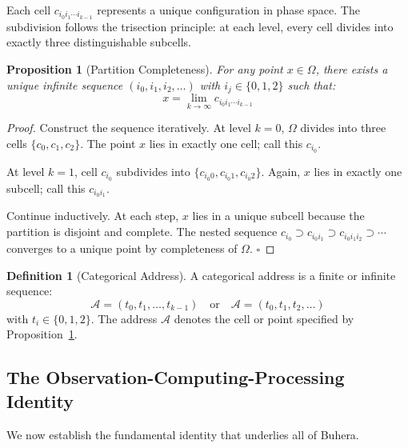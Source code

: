 \documentclass[twocolumn,10pt]{article}
\newtheorem{proposition}[theorem]{Proposition}
\theoremstyle{definition}
\newtheorem{definition}[theorem]{Definition}
\theoremstyle{remark}
\newcommand{\cataddr}{\mathcal{A}}
\begin{document}
Each cell $c_{i_0 i_1 \cdots i_{k-1}}$ represents a unique configuration in phase space. The subdivision follows the trisection principle: at each level, every cell divides into exactly three distinguishable subcells.

\begin{proposition}[Partition Completeness]
\label{prop:partition_complete}
For any point $x \in \Omega$, there exists a unique infinite sequence $(i_0, i_1, i_2, \ldots)$ with $i_j \in \{0,1,2\}$ such that:
\begin{equation}
    x = \lim_{k \to \infty} c_{i_0 i_1 \cdots i_{k-1}}
\end{equation}
\end{proposition}

\begin{proof}
Construct the sequence iteratively. At level $k=0$, $\Omega$ divides into three cells $\{c_0, c_1, c_2\}$. The point $x$ lies in exactly one cell; call this $c_{i_0}$.

At level $k=1$, cell $c_{i_0}$ subdivides into $\{c_{i_0 0}, c_{i_0 1}, c_{i_0 2}\}$. Again, $x$ lies in exactly one subcell; call this $c_{i_0 i_1}$.

Continue inductively. At each step, $x$ lies in a unique subcell because the partition is disjoint and complete. The nested sequence $c_{i_0} \supset c_{i_0 i_1} \supset c_{i_0 i_1 i_2} \supset \cdots$ converges to a unique point by completeness of $\Omega$. $\square$
\end{proof}

\begin{definition}[Categorical Address]
A categorical address is a finite or infinite sequence:
\begin{equation}
    \cataddr = (t_0, t_1, \ldots, t_{k-1}) \quad \text{or} \quad \cataddr = (t_0, t_1, t_2, \ldots)
\end{equation}
with $t_i \in \{0,1,2\}$. The address $\cataddr$ denotes the cell or point specified by Proposition~\ref{prop:partition_complete}.
\end{definition}

\subsection{The Observation-Computing-Processing Identity}

We now establish the fundamental identity that underlies all of Buhera.
\end{document}

